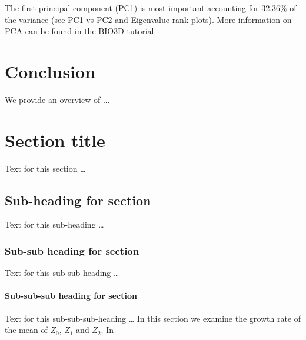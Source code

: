 \documentclass[twocolumn]{bmcart}%
\begin{document}
The first principal component (PC1) is most important accounting for
32.36\% of the variance (see PC1 vs PC2 and Eigenvalue rank plots). More
information on PCA can be found in the
\href{http://thegrantlab.org/bio3d/tutorials/trajectory-analysis}{BIO3D
tutorial}.


\hypertarget{conclusion}{%
\section*{Conclusion}\label{conclusion}}

We provide an overview of ... 



\section*{Section title}
Text for this section \ldots
\subsection*{Sub-heading for section}
Text for this sub-heading \ldots
\subsubsection*{Sub-sub heading for section}
Text for this sub-sub-heading \ldots
\paragraph*{Sub-sub-sub heading for section}
Text for this sub-sub-sub-heading \ldots
In this section we examine the growth rate of the mean of $Z_0$, $Z_1$ and $Z_2$. In


\end{document}
